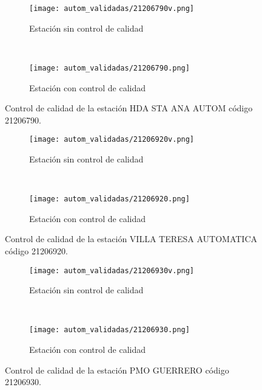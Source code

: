 \begin{figure}[H]
\begin{subfigure}[b]{0.5\textwidth}
\begin{center}
\texttt{[image: autom\_validadas/21206790v.png]}
\caption{Estación sin control de calidad}
        \end{center}
\end{subfigure}
~
\begin{subfigure}[b]{0.5\textwidth}
\begin{center}
\texttt{[image: autom\_validadas/21206790.png]}
\caption{Estación con control de calidad}
\end{center}    
\end{subfigure}
\caption{Control de calidad de la estación HDA STA ANA AUTOM código 21206790.}
\end{figure}    
  
\begin{figure}[H]
\begin{subfigure}[b]{0.5\textwidth}
\begin{center}
\texttt{[image: autom\_validadas/21206920v.png]}
\caption{Estación sin control de calidad}
        \end{center}
\end{subfigure}
~
\begin{subfigure}[b]{0.5\textwidth}
\begin{center}
\texttt{[image: autom\_validadas/21206920.png]}
\caption{Estación con control de calidad}
\end{center}    
\end{subfigure}
\caption{Control de calidad de la estación VILLA TERESA AUTOMATICA código 21206920.}
\end{figure}    
  
\begin{figure}[H]
\begin{subfigure}[b]{0.5\textwidth}
\begin{center}
\texttt{[image: autom\_validadas/21206930v.png]}
\caption{Estación sin control de calidad}
        \end{center}
\end{subfigure}
~
\begin{subfigure}[b]{0.5\textwidth}
\begin{center}
\texttt{[image: autom\_validadas/21206930.png]}
\caption{Estación con control de calidad}
\end{center}    
\end{subfigure}
\caption{Control de calidad de la estación PMO GUERRERO código 21206930.}
\end{figure}    
  
